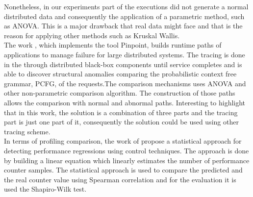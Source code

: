 Nonetheless, in our experiments part of the executions did not generate a normal distributed data and consequently the application of a parametric method, such as ANOVA. This is a major drawback that real data might face and that is the reason for applying other methods such as Kruskal Wallis.\\
The work \cite{50}, which implements the tool Pinpoint, builds runtime paths of applications to manage failure for large distributed systems. The tracing is done in the through distributed black-box components until service completes and is able to discover structural anomalies comparing the probabilistic context free grammar, PCFG, of the requests.The comparison mechanisms uses ANOVA and other non-parametric comparison algorithm. The construction of those paths allows the comparison with normal and abnormal paths. Interesting to highlight that in this work, the solution is a combination of three parts and the tracing part is just one part of it, consequently the solution could be used using other tracing scheme.\\
In terms of profiling comparison, the work of \cite{process_control} propose a statistical approach for detecting performance regressions using control techniques. The approach is done by building a linear equation which linearly estimates the number of performance counter samples. The statistical approach is used to compare the predicted and the real counter value using Spearman correlation and for the evaluation it is used the Shapiro-Wilk test.\\
